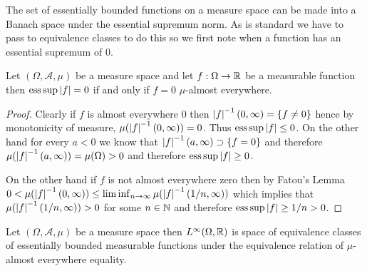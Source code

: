 The set of essentially bounded functions on a measure space can be made into a Banach space under the essential supremum norm.  As is standard we have to pass to equivalence classes to do this so we first note when a function has an essential supremum of $0$.
\begin{prop}Let $(\Omega, \mathcal{A}, \mu)$ be a measure space and let $f : \Omega \to \mathbb{R}$ be a measurable function then $\operatorname*{ess\,sup} \left \vert f \right \vert = 0$ if and only if $f = 0$ $\mu$-almost everywhere.
\end{prop}
\begin{proof}
Clearly if $f$ is almost everywhere $0$ then $\left \vert f \right \vert^{-1}(0, \infty) = \lbrace f \neq 0 \rbrace$ hence by monotonicity of measure, $\mu(\left \vert f \right \vert^{-1}(0,\infty)) = 0$.  Thus $\operatorname*{ess\,sup} \left \vert f \right \vert \leq 0$.  On the other hand for every $a < 0$ we know that $\left \vert f \right \vert^{-1}(a,\infty) \supset \lbrace f = 0 \rbrace$ and therefore $\mu(\left \vert f \right \vert^{-1}(a,\infty)) = \mu(\Omega) > 0$ and therefore $\operatorname*{ess\,sup} \left \vert f \right \vert \geq 0$.  

On the other hand if $f$ is not almost everywhere zero then by Fatou's Lemma $0 < \mu(\left \vert f \right \vert^{-1}(0,\infty)) \leq \liminf_{n \to \infty} \mu(\left \vert f \right \vert^{-1}(1/n, \infty))$ which implies that $\mu(\left \vert f \right \vert^{-1}(1/n, \infty)) > 0$ for some $n \in \mathbb{N}$ and therefore $\operatorname*{ess\,sup} \left \vert f \right \vert \geq 1/n > 0$.
\end{proof}

\begin{defn}Let $(\Omega, \mathcal{A}, \mu)$ be a measure space then $L^\infty(\Omega, \mathbb{R})$ is space of equivalence classes of essentially bounded measurable functions under the equivalence relation of $\mu$-almost everywhere equality.
\end{defn}

